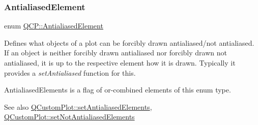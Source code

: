 \subsubsection{\texorpdfstring{Antialiased\+Element}{AntialiasedElement}}
{\footnotesize\ttfamily enum \hyperlink{namespaceQCP_ae55dbe315d41fe80f29ba88100843a0c}{Q\+C\+P\+::\+Antialiased\+Element}}

Defines what objects of a plot can be forcibly drawn antialiased/not antialiased. If an object is neither forcibly drawn antialiased nor forcibly drawn not antialiased, it is up to the respective element how it is drawn. Typically it provides a {\itshape set\+Antialiased} function for this.

{\ttfamily Antialiased\+Elements} is a flag of or-\/combined elements of this enum type.

\begin{DoxySeeAlso}{See also}
\hyperlink{classQCustomPlot_af6f91e5eab1be85f67c556e98c3745e8}{Q\+Custom\+Plot\+::set\+Antialiased\+Elements}, \hyperlink{classQCustomPlot_ae10d685b5eabea2999fb8775ca173c24}{Q\+Custom\+Plot\+::set\+Not\+Antialiased\+Elements} 
\end{DoxySeeAlso}
